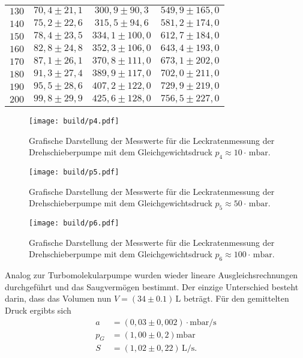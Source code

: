 \begin{table}[H]
\begin{tabular}{c c c c}
    $130$ & $ 70,4 \pm 21,1 $ & $ 300,9 \pm  90,3 $ & $ 549,9 \pm 165,0 $ \\ 
    $140$ & $ 75,2 \pm 22,6 $ & $ 315,5 \pm  94,6 $ & $ 581,2 \pm 174,0 $ \\ 
    $150$ & $ 78,4 \pm 23,5 $ & $ 334,1 \pm 100,0 $ & $ 612,7 \pm 184,0 $ \\ 
    $160$ & $ 82,8 \pm 24,8 $ & $ 352,3 \pm 106,0 $ & $ 643,4 \pm 193,0 $ \\ 
    $170$ & $ 87,1 \pm 26,1 $ & $ 370,8 \pm 111,0 $ & $ 673,1 \pm 202,0 $ \\ 
    $180$ & $ 91,3 \pm 27,4 $ & $ 389,9 \pm 117,0 $ & $ 702,0 \pm 211,0 $ \\ 
    $190$ & $ 95,5 \pm 28,6 $ & $ 407,2 \pm 122,0 $ & $ 729,9 \pm 219,0 $ \\ 
    $200$ & $ 99,8 \pm 29,9 $ & $ 425,6 \pm 128,0 $ & $ 756,5 \pm 227,0 $ \\ 
    \bottomrule
  \end{tabular}
\end{table}

\begin{figure}[H]
  \centering
  \texttt{[image: build/p4.pdf]}
  \caption{Grafische Darstellung der Messwerte für die Leckratenmessung der Drehschieberpumpe mit dem
  Gleichgewichtsdruck $p_4 \approx 10 \cdot \,\si{\milli\bar}$.}
  \label{fig:drehleck1}
\end{figure}

\begin{figure}[H]
  \centering
  \texttt{[image: build/p5.pdf]}
  \caption{Grafische Darstellung der Messwerte für die Leckratenmessung der Drehschieberpumpe mit dem
  Gleichgewichtsdruck $p_5 \approx 50 \cdot \,\si{\milli\bar}$.}
  \label{fig:drehleck2}
\end{figure}

\begin{figure}[H]
  \centering
  \texttt{[image: build/p6.pdf]}
  \caption{Grafische Darstellung der Messwerte für die Leckratenmessung der Drehschieberpumpe mit dem
  Gleichgewichtsdruck $p_6 \approx 100 \cdot \,\si{\milli\bar}$.}
  \label{fig:drehleck3}
\end{figure}
Analog zur Turbomolekularpumpe wurden wieder lineare Ausgleichsrechnungen durchgeführt und das Saugvermögen bestimmt.
Der einzige Unterschied besteht darin, dass das Volumen nun $V=(34 \pm 0.1)\,\si{\liter}$ beträgt.
Für den gemittelten Druck ergibts sich
\begin{align*}
  a &= (0,03 \pm 0,002)\cdot \si{\milli\bar\per\second} \\
  p_G &= (1,00 \pm 0,2)  \si{\milli\bar} \\
  S &= (1,02 \pm 0,22)\,\si{\liter\per\second}.
\end{align*}

